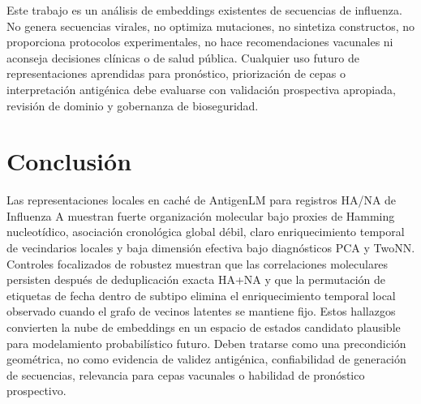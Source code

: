 \documentclass[11pt]{article}
\begin{document}
Este trabajo es un análisis de embeddings existentes de secuencias de influenza. No genera secuencias virales, no optimiza mutaciones, no sintetiza constructos, no proporciona protocolos experimentales, no hace recomendaciones vacunales ni aconseja decisiones clínicas o de salud pública. Cualquier uso futuro de representaciones aprendidas para pronóstico, priorización de cepas o interpretación antigénica debe evaluarse con validación prospectiva apropiada, revisión de dominio y gobernanza de bioseguridad.

\section{Conclusión}

Las representaciones locales en caché de AntigenLM para registros HA/NA de Influenza A muestran fuerte organización molecular bajo proxies de Hamming nucleotídico, asociación cronológica global débil, claro enriquecimiento temporal de vecindarios locales y baja dimensión efectiva bajo diagnósticos PCA y TwoNN. Controles focalizados de robustez muestran que las correlaciones moleculares persisten después de deduplicación exacta HA+NA y que la permutación de etiquetas de fecha dentro de subtipo elimina el enriquecimiento temporal local observado cuando el grafo de vecinos latentes se mantiene fijo. Estos hallazgos convierten la nube de embeddings en un espacio de estados candidato plausible para modelamiento probabilístico futuro. Deben tratarse como una precondición geométrica, no como evidencia de validez antigénica, confiabilidad de generación de secuencias, relevancia para cepas vacunales o habilidad de pronóstico prospectivo.



\end{document}
